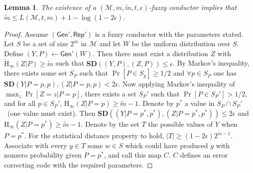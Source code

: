 \documentclass[11pt]{article}
\newcommand{\lemref}[1]{\mbox{Lemma~\ref{#1}}}
\newcommand{\class}[1]{{\ensuremath{\mathsf{#1}}}}
\newcommand{\gen}{\ensuremath{\class{Gen}}\xspace}
\newcommand{\rep}{\ensuremath{\class{Rep}}\xspace}
\newcommand{\Hoo}{\mathrm{H}_\infty}
\newcommand{\Hav}{\tilde{\mathrm{H}}_\infty}
\newtheorem{lemma}[theorem]{Lemma}
\begin{document}
\begin{lemma}
The existence of a $(\mathcal{M}, m, \tilde{m}, t, \epsilon)$-fuzzy conductor implies that $\tilde{m}\leq L(\mathcal{M}, t, m) +1 -\log (1-2\epsilon)$.
\end{lemma}
\begin{proof}  Assume $(\gen', \rep')$ is a fuzzy conductor with the parameters stated.  Let $S$ be a set of size $2^m$ in $\mathcal{M}$ and let $W$ be the uniform distribution over $S$.  Define $(Y, P) \leftarrow \gen'(W)$.  Then there must exist a distribution $Z$ with $\Hav(Z|P) \geq \tilde{m}$ such that $\mathbf{SD}((Y, P), (Z, P))\leq \epsilon$.  By Markov's inequality, there exists some set $S_P$ such that $\Pr[P\in S_p] \geq 1/2$ and $\forall p\in S_P$ one has $\mathbf{SD}(Y | P = p, p ), (Z | P = p, p)<2\epsilon$.  Now applying Markov's inequality of $\max_{z} \Pr[Z=z | P=p]$, there exists a set $S_P'$ such that $\Pr[P\in S_P']>1/2$, and for all $p\in S_P'$, $\Hoo(Z| P =p ) \geq \tilde{m}-1$.  Denote by $p^*$ a value in $S_P\cap S_P'$~(one value must exist).  Then $\mathbf{SD}((Y | P =p^* , p^*), (Z| P = p^*, p^*))\leq 2\epsilon$ and $\Hoo(Z|P=p^*)\geq \tilde{m}-1$.  Denote by the set $T$ the possible values of $Y$ when $P=p^*$.  For the statistical distance property to hold, $|T| \geq  (1-2\epsilon)2^{\tilde{m}-1}$.  Associate with every $y\in T$ some $w\in S$ which could have produced $y$ with nonzero probability given $P=p^*$, and call this map $C$.  $C$ defines an error correcting code with the required parameters.

\end{proof}


\end{document}
